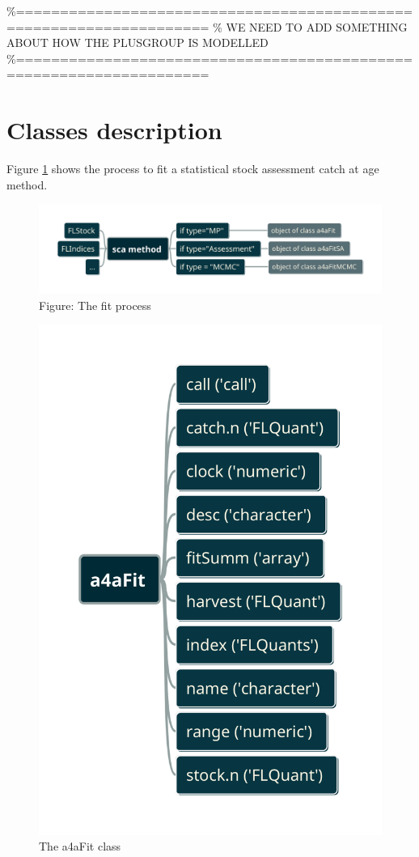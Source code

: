\documentclass[
]{book}
\begin{document}
\%====================================================================
\% WE NEED TO ADD SOMETHING ABOUT HOW THE PLUSGROUP IS MODELLED
\%====================================================================

\hypertarget{classes-description}{%
\section{\texorpdfstring{Classes description \label{sec:classes}}{Classes description }}\label{classes-description}}

Figure \ref{fig:sca} shows the process to fit a statistical stock assessment catch at age method.

\begin{figure}
\centering
\includegraphics{scamethod.png}
\caption{Figure: \label{fig:sca} The fit process}
\end{figure}

\begin{figure}
\centering
\includegraphics{fitclass.png}
\caption{The a4aFit class}
\end{figure}
\end{document}
